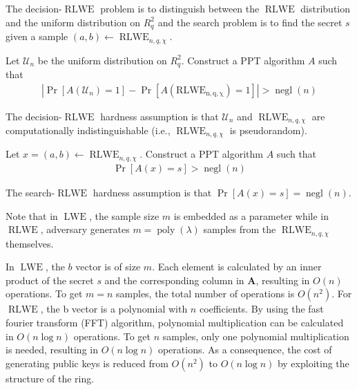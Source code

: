 The decision-$\operatorname{RLWE}$ problem is to distinguish between the $\operatorname{RLWE}$ distribution and the uniform distribution on $R_q^2$ and the search problem is to find the secret $s$ given a sample $(a,b) \leftarrow \operatorname{RLWE}_{n,q,\chi}$.
\begin{definition}
    Let $\mathcal{U}_n$ be the uniform distribution on $R_q^2$. Construct a PPT algorithm $A$ such that 
    \begin{equation*}
        \begin{aligned}
        |\operatorname{Pr}[A(\mathcal{U}_n) = 1] - \operatorname{Pr}[A(\operatorname{RLWE_{n,q,\chi}}) = 1]| > \operatorname{negl}(n)
        \end{aligned}
    \end{equation*}
\end{definition}
The decision-$\operatorname{RLWE}$ hardness assumption is that $\mathcal{U}_n$ and $\operatorname{RLWE}_{n,q,\chi}$ are computationally indistinguishable (i.e., $\operatorname{RLWE}_{n,q,\chi}$ is pseudorandom).
\begin{definition}
    Let $x = (a, b) \leftarrow \operatorname{RLWE}_{n,q,\chi}$. Construct a PPT algorithm $A$ such that 
    \begin{equation*}
        \begin{aligned}
            \operatorname{Pr}[A(x) = s] > \operatorname{negl}(n)
        \end{aligned}
    \end{equation*}
\end{definition}
The search-$\operatorname{RLWE}$ hardness assumption is that $\operatorname{Pr}[A(x) = s] = \operatorname{negl}(n)$.

Note that in $\operatorname{LWE}$, the sample size $m$ is embedded as a parameter while in $\operatorname{RLWE}$, adversary generates $m = \operatorname{poly}(\lambda)$ samples from the $\operatorname{RLWE}_{n,q,\chi}$ themselves.

In $\operatorname{LWE}$, the $b$ vector is of size $m$. Each element is calculated by an inner product of the secret $s$ and the corresponding column in $\textbf{A}$, resulting in $O(n)$ operations. To get $m = n$ samples, the total number of operations is $O(n^2)$. For $\operatorname{RLWE}$, the b vector is a polynomial with $n$ coefficients. By using the fast fourier transform (FFT) algorithm, polynomial multiplication can be calculated in $O(n \log n)$ operations. To get $n$ samples, only one polynomial multiplication is needed, resulting in $O(n \log n)$ operations. As a consequence, the cost of generating public keys is reduced from $O(n^2)$ to $O(n \log n)$ by exploiting the structure of the ring.